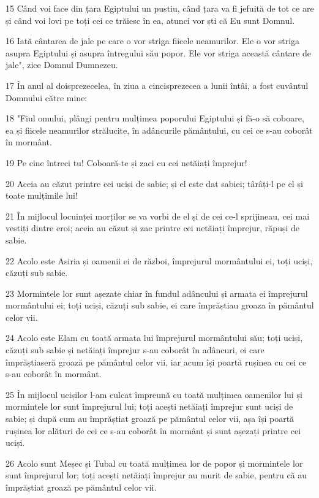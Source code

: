 \par 15 Când voi face din țara Egiptului un pustiu, când țara va fi jefuită de tot ce are și când voi lovi pe toți cei ce trăiesc în ea, atunci vor ști că Eu sunt Domnul.
\par 16 Iată cântarea de jale pe care o vor striga fiicele neamurilor. Ele o vor striga asupra Egiptului și asupra întregului său popor. Ele vor striga această cântare de jale", zice Domnul Dumnezeu.
\par 17 În anul al doisprezecelea, în ziua a cincisprezecea a lunii întâi, a fost cuvântul Domnului către mine:
\par 18 "Fiul omului, plângi pentru mulțimea poporului Egiptului și fă-o să coboare, ea și fiicele neamurilor strălucite, în adâncurile pământului, cu cei ce s-au coborât în mormânt.
\par 19 Pe cine întreci tu! Coboară-te și zaci cu cei netăiați împrejur!
\par 20 Aceia au căzut printre cei uciși de sabie; și el este dat sabiei; târâți-l pe el și toate mulțimile lui!
\par 21 În mijlocul locuinței morților se va vorbi de el și de cei ce-l sprijineau, cei mai vestiți dintre eroi; aceia au căzut și zac printre cei netăiați împrejur, răpuși de sabie.
\par 22 Acolo este Asiria și oamenii ei de război, împrejurul mormântului ei, toți uciși, căzuți sub sabie.
\par 23 Mormintele lor sunt așezate chiar în fundul adâncului și armata ei împrejurul mormântului ei; toți uciși, căzuți sub sabie, ei care împrăștiau groaza în pământul celor vii.
\par 24 Acolo este Elam cu toată armata lui împrejurul mormântului său; toți uciși, căzuți sub sabie și netăiați împrejur s-au coborât în adâncuri, ei care împrăștiaseră groază pe pământul celor vii, iar acum își poartă rușinea cu cei ce s-au coborât în mormânt.
\par 25 În mijlocul ucișilor l-am culcat împreună cu toată mulțimea oamenilor lui și mormintele lor sunt împrejurul lui; toți acești netăiați împrejur sunt uciși de sabie; și după cum au împrăștiat groază pe pământul celor vii, așa își poartă rușinea lor alături de cei ce s-au coborât în mormânt și sunt așezați printre cei uciși.
\par 26 Acolo sunt Meșec și Tubal cu toată mulțimea lor de popor și mormintele lor sunt împrejurul lor; toți acești netăiați împrejur au murit de sabie, pentru că au împrăștiat groază pe pământul celor vii.
